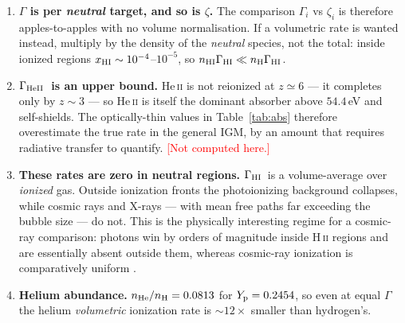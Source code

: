 \documentclass[11pt,a4paper]{article}
\newcommand{\GHI}{\ensuremath{\Gamma_{\rm HI}}}
\newcommand{\GHeII}{\ensuremath{\Gamma_{\rm HeII}}}
\newcommand{\flag}[1]{\textcolor{red}{\textsf{[#1]}}}
\begin{document}
\begin{enumerate}[leftmargin=1.7em]
\item \textbf{$\Gamma$ is per \emph{neutral} target, and so is $\zeta$.}  The
      comparison $\Gamma_i$ vs $\zeta_i$ is therefore apples-to-apples with no
      volume normalisation.  If a volumetric rate is wanted instead, multiply
      by the density of the \emph{neutral} species, not the total: inside
      ionized regions $x_{\rm HI}\sim10^{-4}$--$10^{-5}$, so
      $n_{\rm HI}\Gamma_{\rm HI}\ll n_{\rm H}\Gamma_{\rm HI}$.
\item \textbf{\GHeII\ is an upper bound.}  He\,\textsc{ii} is not reionized at
      $z\simeq6$ --- it completes only by $z\sim3$ \citep{Villasenor2021} ---
      so He\,\textsc{ii} is itself the dominant absorber above $54.4\,$eV and
      self-shields.  The optically-thin values in Table~\ref{tab:abs} therefore
      overestimate the true rate in the general IGM, by an amount that
      requires radiative transfer to quantify.  \flag{Not computed here.}
\item \textbf{These rates are zero in neutral regions.}  \GHI\ is a
      volume-average over \emph{ionized} gas.  Outside ionization fronts the
      photoionizing background collapses, while cosmic rays and X-rays --- with
      mean free paths far exceeding the bubble size --- do not.  This is the
      physically interesting regime for a cosmic-ray comparison: photons win by
      orders of magnitude inside H\,\textsc{ii} regions and are essentially
      absent outside them, whereas cosmic-ray ionization is comparatively
      uniform \citep{Sazonov2015,GesseyJones2023}.
\item \textbf{Helium abundance.}  $n_{\rm He}/n_{\rm H}=0.0813$ for
      $Y_{\rm p}=0.2454$, so even at equal $\Gamma$ the helium
      \emph{volumetric} ionization rate is $\sim12\times$ smaller than
      hydrogen's.
\end{enumerate}



\end{document}
